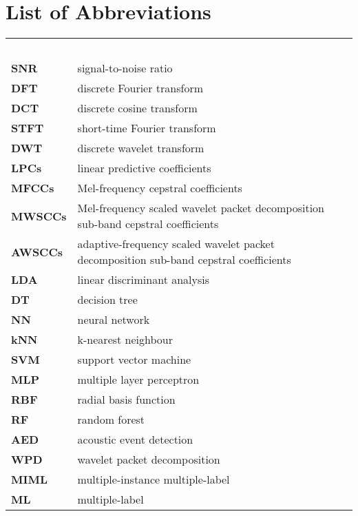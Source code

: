 

\chapter*{List of Abbreviations}


\renewcommand{\arraystretch}{1.4} 
\begin{longtable}{llr}
\multicolumn{3}{l}{\textbf{}\hspace{0.4\textwidth}~~}\\
\textbf{SNR}   &     signal-to-noise ratio\\
\textbf{DFT}   &                    discrete Fourier transform \\
\textbf{DCT}    &                    discrete cosine transform \\
\textbf{STFT} & short-time Fourier transform \\
\textbf{DWT}   & discrete wavelet transform \\
\textbf{LPCs}	 &                   linear predictive coefficients \\
\textbf{MFCCs} &	       Mel-frequency cepstral coefficients \\
\textbf{MWSCCs} & Mel-frequency scaled wavelet packet decomposition sub-band cepstral coefficients \\
\textbf{AWSCCs} & adaptive-frequency scaled wavelet packet decomposition sub-band cepstral coefficients \\
\textbf{LDA}      &                  linear discriminant analysis \\
\textbf{DT}     &                  decision tree                       \\
\textbf{NN}     &    neural network  \\
\textbf{kNN}	  &                  k-nearest neighbour \\
\textbf{SVM}	     &               support vector machine \\
\textbf{MLP}    &                   multiple layer perceptron \\
\textbf{RBF}    &                   radial basis function \\
\textbf{RF}     &                      random forest \\
\textbf{AED}	   &                 acoustic event detection \\
\textbf{WPD}     &                 wavelet packet decomposition \\
\textbf{MIML}   &                 multiple-instance multiple-label  \\ 
\textbf{ML}    &                      multiple-label \\
\end{longtable}

